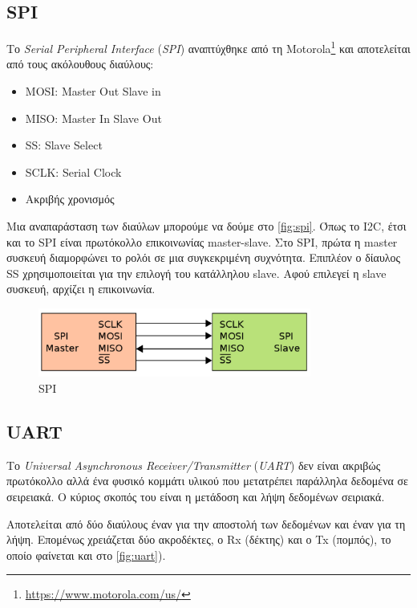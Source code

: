\subsection{SPI}
\label{subsec:SPI}

Το \textit{Serial Peripheral Interface} (\textit{SPI}) αναπτύχθηκε από τη Motorola\footnote{\url{https://www.motorola.com/us/}} και αποτελείται από τους ακόλουθους διαύλους:

\begin{itemize}
	\item MOSI: Master Out Slave in
	\item MISO: Master In Slave Out
	\item SS: Slave Select
	\item SCLK: Serial Clock
	\item Ακριβής χρονισμός
\end{itemize}

Μια αναπαράσταση των διαύλων μπορούμε να δούμε στο \autoref{fig:spi}. Όπως το I2C, έτσι και το SPI είναι πρωτόκολλο επικοινωνίας master-slave. Στο SPI, πρώτα η master συσκευή διαμορφώνει το ρολόι σε μια συγκεκριμένη συχνότητα. Επιπλέον ο δίαυλος SS χρησιμοποιείται για την επιλογή του κατάλληλου slave. Αφού επιλεγεί η slave συσκευή, αρχίζει η επικοινωνία.

\begin{figure}[!ht]
	\centering
	\includegraphics[width=0.8\textwidth]{./images/chapter2/spi.png}
	\caption{SPI}
	\label{fig:spi}
\end{figure}

\subsection{UART}
\label{subsec:UART}

Το \textit{Universal Asynchronous Receiver/Transmitter} (\textit{UART}) δεν είναι ακριβώς πρωτόκολλο αλλά ένα φυσικό κομμάτι υλικού που μετατρέπει παράλληλα δεδομένα σε σειρειακά. Ο κύριος σκοπός του είναι η μετάδοση και λήψη δεδομένων σειριακά.

Αποτελείται από δύο διαύλους έναν για την αποστολή των δεδομένων και έναν για τη λήψη. Επομένως χρειάζεται δύο ακροδέκτες, ο Rx (δέκτης) και ο Tx (πομπός), το οποίο φαίνεται και στο \autoref{fig:uart}).


